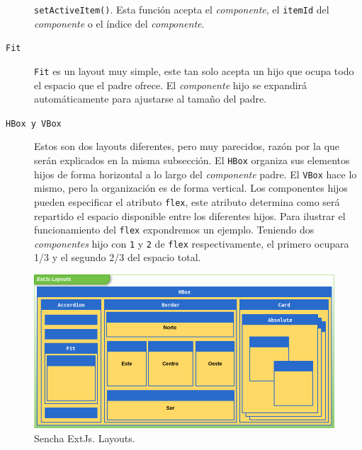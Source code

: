 \begin{description}
			  \texttt{setActiveItem()}. Esta función acepta el \emph{componente}, el \texttt{itemId} del \emph{componente} o el índice del
			  \emph{componente}.
			\item[\texttt{Fit}] \texttt{Fit} es un layout muy simple, este tan solo acepta un hijo que ocupa todo el espacio que el padre
			  ofrece. El \emph{componente} hijo se expandirá automáticamente para ajustarse al tamaño del padre.
			\item[\texttt{HBox y VBox}] Estos son dos layouts diferentes, pero muy parecidos, razón por la que serán explicados en la
			  misma subsección. El \texttt{HBox} organiza sus elementos hijos de forma horizontal a lo largo del \emph{componente} padre.
			  El \texttt{VBox} hace lo mismo, pero la organización es de forma vertical. Los componentes hijos pueden especificar el
			  atributo \texttt{flex}, este atributo determina como será repartido el espacio disponible entre los diferentes hijos. Para
			  ilustrar el funcionamiento del \texttt{flex} expondremos un ejemplo. Teniendo dos \emph{componentes} hijo con \texttt{1} y
			  \texttt{2} de \texttt{flex} respectivamente, el primero ocupara 1/3 y el segundo 2/3 del espacio total.
		\end{description}
		\begin{figure}[h]
			\centering
			\includegraphics[keepaspectratio, width=1\textwidth]{./img/layouts.png}
			\caption{Sencha ExtJs. Layouts.}   
			\label{fig:layouts}
		\end{figure}

